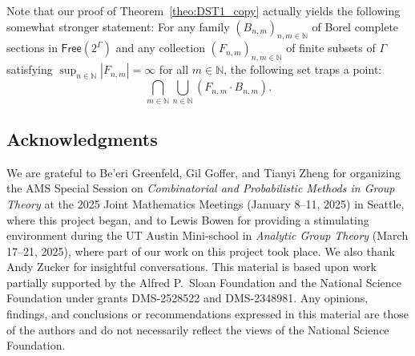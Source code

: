 \documentclass[11pt,reqno,psamsfonts]{amsart}
\theoremstyle{bfnote}
\theoremstyle{definition}
\theoremstyle{remark}
\newcommand{\0}{\varnothing}
\newcommand{\G}{\Gamma}
\newcommand{\Free}{\mathsf{Free}}
\newcommand{\N}{\mathbb{N}}
\numberwithin{equation}{section}
\begin{document}
    Note that our proof of Theorem~\ref{theo:DST1_copy} actually yields the following somewhat stronger statement: For any family $(B_{n,m})_{n,m \in \N}$ of Borel complete sections in $\Free(2^\G)$ and any collection $(F_{n,m})_{n,m \in \N}$ of finite subsets of $\G$ satisfying $\sup_{n \in \N} |F_{n,m}| = \infty$ for all $m \in \N$, the following set traps a point:
    \[
        \bigcap_{m \in \N} \bigcup_{n \in \N} (F_{n,m} \cdot B_{n,m}).
    \]


    

    

    \subsection*{Acknowledgments}

    We are grateful to Be'eri Greenfeld, Gil Goffer, and Tianyi Zheng for organizing the AMS Special Session on \emph{Combinatorial and Probabilistic Methods in Group Theory} at the 2025 Joint Mathematics Meetings (January 8--11, 2025) in Seattle, where this project began, and to Lewis Bowen for providing a stimulating environment during the UT Austin Mini-school in \emph{Analytic Group Theory} (March 17--21, 2025), where part of our work on this project took place. We also thank Andy Zucker for insightful conversations. This material is based upon work partially supported by the Alfred P.~Sloan Foundation and the National Science Foundation under grants DMS-2528522 and DMS-2348981. Any opinions, findings, and conclusions or recommendations expressed in this material are those of the authors and do not necessarily reflect the views of the National Science Foundation.


\printbibliography
\end{document}
